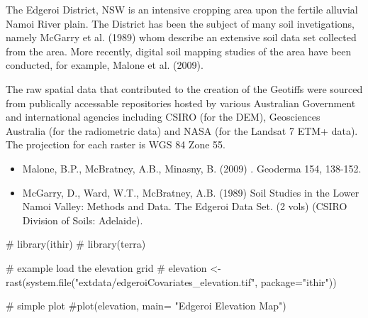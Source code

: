 \documentclass[a4paper]{book}
\begin{document}
%
\begin{Details}
The Edgeroi District, NSW is an intensive cropping area upon the fertile alluvial Namoi River plain. The District has been the subject of many soil invetigations, namely McGarry et al. (1989) whom describe an extensive soil data set collected from the area. More recently, digital soil mapping studies of the area have been conducted, for example, Malone et al. (2009).
\end{Details}
%
\begin{Note}
The raw spatial data that contributed to the creation of the Geotiffs were sourced from publically accessable repositories hosted by various Australian Government and international agencies including CSIRO (for the DEM), Geosciences Australia (for the radiometric data) and NASA (for the Landsat 7 ETM+ data). The projection for each raster is WGS 84 Zone 55.
\end{Note}
%
\begin{References}
\begin{itemize}

\item{} Malone, B.P., McBratney, A.B., Minasny, B. (2009) . Geoderma 154, 138-152.
\item{} McGarry, D., Ward, W.T., McBratney, A.B. (1989) Soil Studies in the Lower Namoi Valley: Methods and Data. The Edgeroi Data Set. (2 vols) (CSIRO Division of Soils: Adelaide).

\end{itemize}

\end{References}
%
\begin{Examples}
\begin{ExampleCode}

# library(ithir)
# library(terra)

# example load the elevation grid
# elevation <- rast(system.file("extdata/edgeroiCovariates_elevation.tif", package="ithir"))

# simple plot
#plot(elevation, main= "Edgeroi Elevation Map")

\end{ExampleCode}
\end{Examples}
\end{document}
